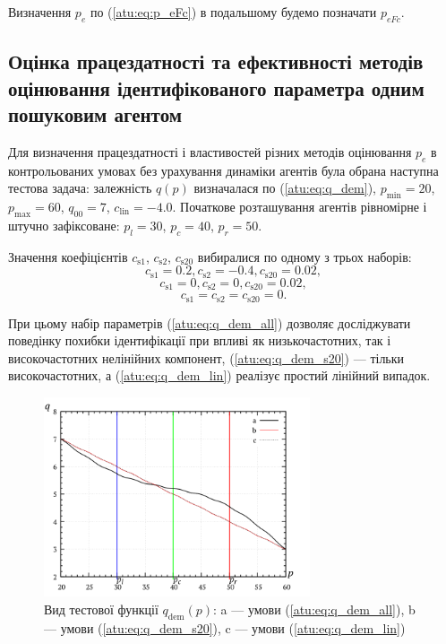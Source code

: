 Визначення $p_e$ по (\ref{atu:eq:p_eFc}) в подальшому будемо позначати $p_{eFc}$.



\subsection{Оцінка працездатності та ефективності методів оцінювання ідентифікованого параметра одним пошуковим агентом} %

Для визначення працездатності і властивостей різних методів оцінювання $p_e$
в контрольованих умовах без урахування динаміки агентів була обрана наступна
тестова задача: залежність $q(p)$ визначалася по (\ref{atu:eq:q_dem}),
$p_{\min}=20$, $p_{\max}=60$,
$q_{00}=7$, $c_\mathrm{lin}=-4.0$.
Початкове розташування агентів рівномірне і штучно зафіксоване:
$p_l=30$, $p_c=40$,  $p_r=50$.

Значення коефіцієнтів
$c_\mathrm{s1}$, $c_\mathrm{s2}$, $c_\mathrm{s20}$
вибиралися по одному з трьох наборів:
%
\begin{equation}
  c_\mathrm{s1} = 0.2, c_\mathrm{s2} = -0.4, c_\mathrm{s20} = 0.02,
  \label{atu:eq:q_dem_all}
\end{equation}
%
\begin{equation}
  c_\mathrm{s1} = 0, c_\mathrm{s2} = 0, c_\mathrm{s20} = 0.02,
  \label{atu:eq:q_dem_s20}
\end{equation}
%
\begin{equation}
  c_\mathrm{s1} = c_\mathrm{s2} = c_\mathrm{s20} = 0 .
  \label{atu:eq:q_dem_lin}
\end{equation}

При цьому набір параметрів (\ref{atu:eq:q_dem_all}) дозволяє досліджувати
поведінку похибки ідентифікації при впливі як низькочастотних,
так і високочастотних нелінійних компонент,
(\ref{atu:eq:q_dem_s20}) ---
тільки високочастотних,
а (\ref{atu:eq:q_dem_lin})
реалізує простий лінійний випадок.

\begin{figure}[htb!]
  \begin{center}
    \includegraphics[width=0.7\textwidth]{p/q_p_dem.png}
  \end{center}
  \caption{Вид тестової функції $q_\mathrm{dem}(p)$:
     a --- умови (\ref{atu:eq:q_dem_all}),
     b --- умови (\ref{atu:eq:q_dem_s20}),
     c --- умови (\ref{atu:eq:q_dem_lin})
  }
  \label{atu:f:q_dem}
\end{figure}


